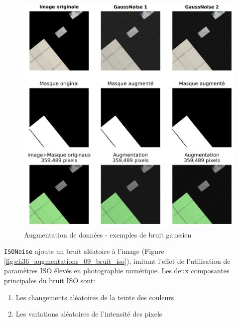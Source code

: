 \begin{figure}[H]
    \centering
    \includegraphics[width=1\linewidth]{02-main/figures/ch3/ch36_augmentations_08_bruit_gaussien.png}
    \caption{Augmentation de données - exemples de bruit gaussien}
    \label{fig:ch36_augmentations_08_bruit_gaussien}
\end{figure}

\newpage
\texttt{ISONoise} ajoute un bruit aléatoire à l'image (Figure \ref{fig:ch36_augmentations_09_bruit_iso}), imitant l'effet de l'utilisation de paramètres ISO élevés en photographie numérique. Les deux composantes principales du bruit ISO sont:
\begin{enumerate}
    \item Les changements aléatoires de la teinte des couleurs
    \item Les variations aléatoires de l'intensité des pixels
\end{enumerate}

